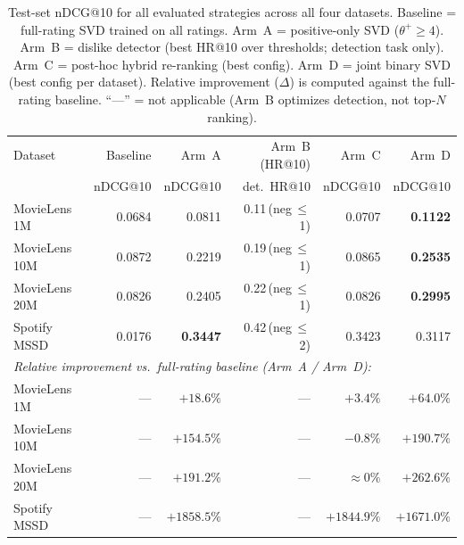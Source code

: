 \begin{table}[ht]
\centering
\caption{Test-set nDCG@10 for all evaluated strategies across all four datasets.
  Baseline = full-rating SVD trained on all ratings.
  Arm~A = positive-only SVD ($\theta^+\!\geq\!4$).
  Arm~B = dislike detector (best HR@10 over thresholds; detection task only).
  Arm~C = post-hoc hybrid re-ranking (best config).
  Arm~D = joint binary SVD (best config per dataset).
  Relative improvement ($\Delta$) is computed against the full-rating baseline.
  ``---'' = not applicable (Arm~B optimizes detection, not top-$N$ ranking).}
\label{tab:master_results}
\begin{tabular}{lrrrrr}
\toprule
Dataset        & Baseline & Arm~A  & Arm~B (HR@10) & Arm~C  & Arm~D  \\
               & nDCG@10  & nDCG@10 & det.\ HR@10  & nDCG@10 & nDCG@10 \\
\midrule
MovieLens 1M   & 0.0684   & 0.0811  & 0.11\,(neg\,$\leq$1)  & 0.0707  & \textbf{0.1122} \\
MovieLens 10M  & 0.0872   & 0.2219  & 0.19\,(neg\,$\leq$1)  & 0.0865  & \textbf{0.2535} \\
MovieLens 20M  & 0.0826   & 0.2405  & 0.22\,(neg\,$\leq$1)  & 0.0826  & \textbf{0.2995} \\
Spotify MSSD   & 0.0176   & \textbf{0.3447}  & 0.42\,(neg\,$\leq$2)  & 0.3423  & 0.3117  \\
\midrule
\multicolumn{6}{l}{\textit{Relative improvement vs.\ full-rating baseline (Arm~A / Arm~D):}} \\
MovieLens 1M   & ---      & $+18.6\%$  & ---  & $+3.4\%$  & $+64.0\%$ \\
MovieLens 10M  & ---      & $+154.5\%$ & ---  & $-0.8\%$  & $+190.7\%$ \\
MovieLens 20M  & ---      & $+191.2\%$ & ---  & $\approx\!0\%$ & $+262.6\%$ \\
Spotify MSSD   & ---      & $+1858.5\%$ & --- & $+1844.9\%$ & $+1671.0\%$ \\
\bottomrule
\end{tabular}
\end{table}
